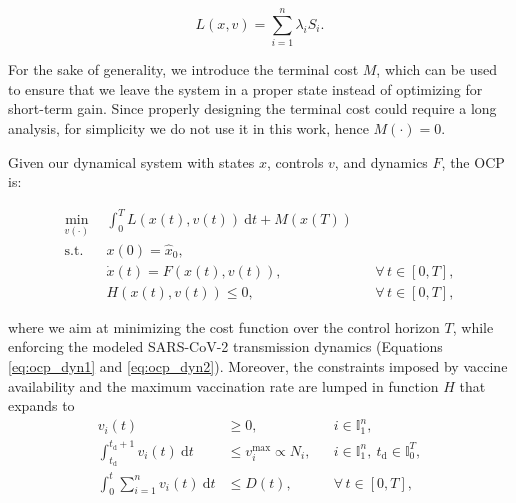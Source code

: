 \begin{equation*}
    L(x,v) = \sum_{i=1}^n \lambda_i S_i.
\end{equation*}

For the sake of generality, we introduce the terminal cost $M$, which can be used to ensure that we leave the system in a proper state instead of optimizing for short-term gain. Since properly designing the terminal cost could require a long analysis, for simplicity we do not use it in this work, hence $M(\cdot) = 0$.

Given our dynamical system with states $x$, controls $v$, and dynamics $F$, the OCP is:

\begin{subequations}
    \label{eq:ocp}
    \begin{align}
        \min_{v(\cdot)} \ \ & \int_{0}^{T} L(x(t),v(t)) \ \mathrm{d}t + M(x(T)) \\ \label{eq:ocp_dyn1}
        \mathrm{s.t.} \ \ & x(0) = \hat x_0, \\ \label{eq:ocp_dyn2}
        &\dot x(t) = F(x(t),v(t)), && \forall \, t\in[0,T], \\ 
        &H(x(t),v(t)) \leq 0, && \forall \, t\in[0,T],
    \end{align}
\end{subequations}

where we aim at minimizing the cost function over the control horizon $T$, while enforcing the modeled SARS-CoV-2 transmission dynamics (Equations \eqref{eq:ocp_dyn1} and \eqref{eq:ocp_dyn2}). Moreover, the constraints imposed by vaccine availability and the maximum vaccination rate are lumped in function $H$ that expands to
\begin{subequations}
    \begin{align}
        v_i(t) &\geq 0, && i\in\mathbb{I}_1^n, \label{eq:constr_vacc_met} \\
        \int_{t_\mathrm{d}}^{t_\mathrm{d}+1} v_i(t) \ \mathrm{d}t &\leq v_i^\mathrm{max} \propto N_i, && i\in\mathbb{I}_1^n,\ t_\mathrm{d} \in \mathbb{I}_0^T,  \label{eq:constr_day_met} \\
        \int_{0}^{t} \sum_{i=1}^n v_i(t) \ \mathrm{d}t &\leq D(t), && \forall \, t\in[0,T], \label{eq:constr_week_met}
    \end{align}
\end{subequations}

